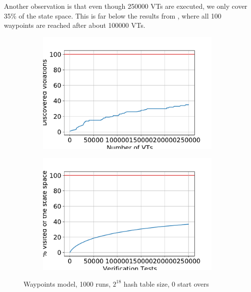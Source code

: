 \documentclass[
fancyheadings, %
%
%
]{stsreprt}
\begin{document}
Another observation is that even though \num{250000} VTs are executed, we only cover 35\% of the state space.
This is far below the results from \cite{DeFrancisco2020.Grapple}, where all 100 waypoints are reached after about \num{100000} VTs.

\begin{figure}[h]
    \begin{subfigure}[b]{.5\textwidth}
        \centering
        \includegraphics[width=\textwidth]{figures/experiments/output1-discovered-violations-abs-numbers.pdf}
    \end{subfigure}
    \begin{subfigure}[b]{.5\textwidth}
        \centering
        \includegraphics[width=\textwidth]{figures/experiments/output1-covered-state-space-in-percent.pdf}
    \end{subfigure}
    \caption{Waypoints model, \num{1000} runs, $2^{18}$ hash table size, 0 start overs}
    \label{fig:experiments:output1}
\end{figure}
\end{document}
